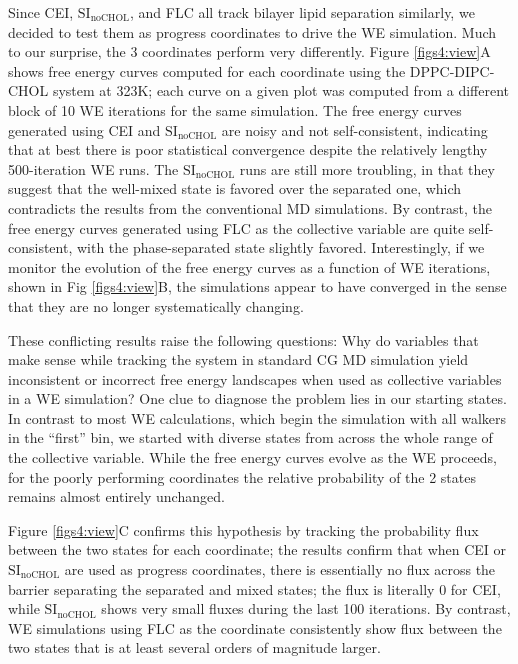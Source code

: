 \documentclass{biophys-new}
\begin{document}
Since CEI, $\text{SI}_{\text{noCHOL}}$, and FLC all track bilayer lipid separation similarly,
we decided to test them as progress coordinates to drive the WE simulation.
Much to our surprise, the 3 coordinates perform very differently.
Figure \ref{figs4:view}A shows free energy curves computed for each coordinate using the DPPC-DIPC-CHOL system at 323K; each curve on a given plot was computed from a different block of 10 WE iterations for the same simulation. The free energy curves generated using CEI and $\text{SI}_{\text{noCHOL}}$ are noisy and not self-consistent, indicating that at best there is poor statistical convergence despite the relatively lengthy 500-iteration WE runs. The $\text{SI}_{\text{noCHOL}}$ runs are still more troubling, in that they suggest that the well-mixed state is favored over the separated one, which contradicts the results from the conventional MD simulations. By contrast, the free energy curves generated using FLC as the collective variable are quite self-consistent, with the phase-separated state slightly favored.
Interestingly, if we monitor the evolution of the free energy curves as a function of WE iterations, shown in Fig \ref{figs4:view}B, the simulations appear to have converged in the sense that they are no longer systematically changing.

These conflicting results raise the following questions: Why do variables that make sense while tracking the system in standard CG MD simulation yield inconsistent or incorrect free energy landscapes when used as collective variables in a  WE simulation?  One clue to diagnose the problem lies in our starting states. In contrast to most WE calculations, which begin the simulation with all walkers in the ``first'' bin, we started with diverse states from across the whole range of the collective variable. While the free energy curves evolve as the WE proceeds, for the poorly performing coordinates the relative probability of the 2 states remains almost entirely unchanged.

Figure \ref{figs4:view}C confirms this hypothesis by tracking the probability flux between the two states for each coordinate; the results confirm that when CEI or $\text{SI}_{\text{noCHOL}}$ are used as progress coordinates, there is essentially no flux across the barrier separating the separated and mixed states; the flux is literally 0 for CEI, while $\text{SI}_{\text{noCHOL}}$ shows very small fluxes during the last 100 iterations. By contrast, WE simulations using FLC as the coordinate consistently show flux between the two states that is at least several orders of magnitude larger.
\end{document}
